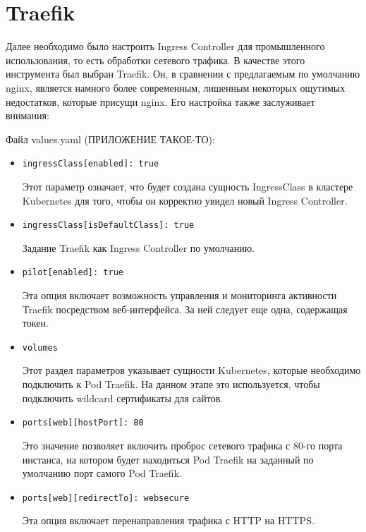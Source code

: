 \section{Traefik}
\label{sec:traefik}

Далее необходимо было настроить Ingress Controller для промышленного использования, то есть обработки сетевого трафика. В качестве этого инструмента был выбран Traefik.
Он, в сравнении с предлагаемым по умолчанию nginx, является намного более современным, лишенным некоторых ощутимых недостатков, которые присущи nginx. Его настройка также заслуживает внимания:

Файл values.yaml (ПРИЛОЖЕНИЕ ТАКОЕ-ТО):
\begin{itemize}
    \item \texttt{ingressClass[enabled]: true}

        Этот параметр означает, что будет создана сущность IngressClass в кластере Kubernetes для того, чтобы он корректно увидел новый Ingress Controller.

    \item \texttt{ingressClass[isDefaultClass]: true}

        Задание Traefik как Ingress Controller по умолчанию.

    \item \texttt{pilot[enabled]: true}

        Эта опция включает возможность управления и мониторинга активности Traefik посредством веб-интерфейса. За ней следует еще одна, содержащая токен.

    \item \texttt{volumes}

        Этот раздел параметров указывает сущности Kubernetes, которые необходимо подключить к Pod Traefik. На данном этапе это используется, чтобы подключить wildcard сертификаты
        для сайтов.

    \item \texttt{ports[web][hostPort]: 80}

        Это значение позволяет включить проброс сетевого трафика с 80-го порта инстанса, на котором будет находиться Pod Traefik на заданный по умолчанию порт самого Pod Traefik.

    \item \texttt{ports[web][redirectTo]: websecure}

        Эта опция включает перенаправления трафика с HTTP на HTTPS.


\end{itemize}
